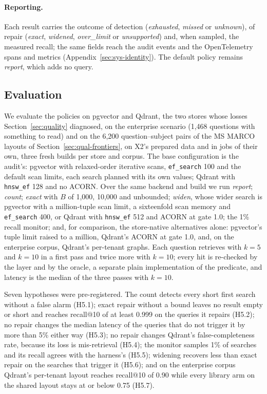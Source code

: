 \paragraph{Reporting.}
Each result carries the outcome of detection (\emph{exhausted}, \emph{missed} or \emph{unknown}),
of repair (\emph{exact}, \emph{widened}, \emph{over\_limit} or \emph{unsupported}) and, when sampled,
the measured recall; the same fields reach the audit events and the OpenTelemetry spans and metrics
(Appendix~\ref{sec:sys-identity}). The default policy remains \emph{report}, which adds no query.

\subsection{Evaluation}\label{sec:rep-eval}

We evaluate the policies on pgvector and Qdrant, the two stores whose losses
Section~\ref{sec:quality} diagnosed, on the enterprise scenario (1,468 questions with something to
read) and on the 6,200 question--subject pairs of the MS MARCO layouts of
Section~\ref{sec:qual-frontiers}, on X2's prepared data and in jobs of their own, three fresh builds
per store and corpus. The base configuration is the audit's: pgvector with relaxed-order iterative
scans, \texttt{ef\_search} 100 and the default scan limits, each search planned with its own values;
Qdrant with \texttt{hnsw\_ef} 128 and no ACORN. Over the same backend and build we run
\emph{report}; \emph{count}; \emph{exact} with $B$ of 1,000, 10,000 and unbounded; \emph{widen},
whose wider search is pgvector with a million-tuple scan limit, a sixteenfold scan memory and
\texttt{ef\_search} 400, or Qdrant with \texttt{hnsw\_ef} 512 and ACORN at gate 1.0; the 1\% recall
monitor; and, for comparison, the store-native alternatives alone: pgvector's tuple limit raised to a
million, Qdrant's ACORN at gate 1.0, and, on the enterprise corpus, Qdrant's per-tenant graphs. Each
question retrieves with $k = 5$ and $k = 10$ in a first pass and twice more with $k = 10$; every hit is
re-checked by the layer and by the oracle, a separate plain implementation of the predicate, and latency is the median of the three passes
with $k = 10$.

Seven hypotheses were pre-registered. The count detects every short first search without a false
alarm (H5.1); exact repair without a bound leaves no result empty or short and reaches recall@10 of
at least 0.999 on the queries it repairs (H5.2); no repair changes the median latency of the queries that do not
trigger it by more than 5\% either way (H5.3); no repair changes Qdrant's false-completeness rate, because its loss is mis-retrieval
(H5.4); the monitor samples 1\% of searches and its recall agrees with the harness's (H5.5);
widening recovers less than exact repair on the searches that trigger it (H5.6); and on the
enterprise corpus Qdrant's per-tenant layout reaches recall@10 of 0.90 while every library arm on
the shared layout stays at or below 0.75 (H5.7).

